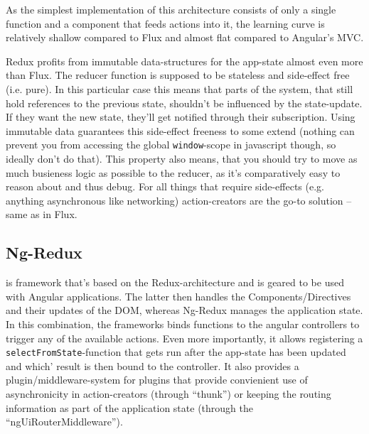 As the simplest implementation of this architecture consists of only a single function and a component that feeds actions into it, the learning curve is relatively shallow compared to Flux and almost flat compared to Angular's MVC.

Redux profits from immutable data-structures for the app-state almost even more than Flux. The reducer function is supposed to be stateless and side-effect free (i.e. pure). In this particular case this means that parts of the system, that still hold references to the previous state, shouldn't be influenced by the state-update. If they want the new state, they'll get notified through their subscription. Using immutable data guarantees this side-effect freeness to some extend (nothing can
prevent you from accessing the global \texttt{window}-scope in javascript though, so ideally don't do that). This property also means, that you should try to move as much busieness logic as possible to the reducer, as it's comparatively easy to reason about and thus debug. For all things that require side-effects (e.g. anything asynchronous like networking) action-creators are the go-to solution -- same as in Flux.

\subsection{Ng-Redux}\label{ref:ng-redux}

 is framework that's based on the Redux-architecture and is geared to be used with Angular applications. The latter then handles the Components/Directives and their updates of the DOM, whereas Ng-Redux manages the application state. In this combination, the frameworks binds functions to the angular controllers to trigger any of the available actions. Even more importantly, it allows registering a \texttt{selectFromState}-function that gets run after
the app-state has been updated and which' result is then bound to the controller. It also provides a plugin/middleware-system for plugins that provide convienient use of asynchronicity in action-creators (through ``thunk'') or keeping the routing information as part of the application state (through the ``ngUiRouterMiddleware'').


